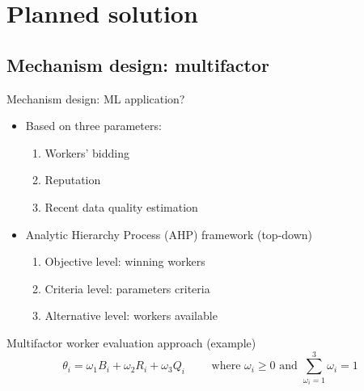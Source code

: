 

\section{Planned solution}

\subsection{Mechanism design: multifactor}

\begin{frame}{Mechanism design: ML application?}
  \begin{itemize}
    \item Based on three parameters:
          \begin{enumerate}
            \item \alert{Workers' bidding}
            \item \alert{Reputation}
            \item \alert{Recent data quality estimation}
          \end{enumerate}
    \item Analytic Hierarchy Process (AHP) framework \rightarrow (top-down)
    	\begin{enumerate}
            \item \alert{Objective level}: winning workers
            \item \alert{Criteria level}: parameters criteria
            \item \alert{Alternative level}: workers available
          \end{enumerate}
    \end{itemize}
    \begin{exampleblock}{Multifactor worker evaluation approach (example)}
    	\begin{equation*}
      	\theta_{i}=\omega_{1} B_{i}+\omega_{2} R_{i}+\omega_{3} Q_{i} \quad\quad \text { where } \omega_{i} \geq 0 \text { and } \sum_{\omega_{i}=1}^{3} \omega_{i}=1	
    	\end{equation*}
  \end{exampleblock}
\end{frame}

